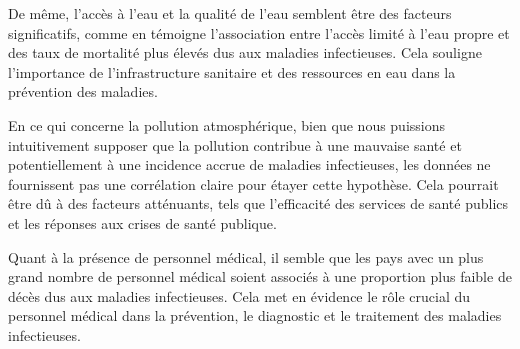 \documentclass[
]{article}
\begin{document}
De même, l'accès à l'eau et la qualité de l'eau semblent être des
facteurs significatifs, comme en témoigne l'association entre l'accès
limité à l'eau propre et des taux de mortalité plus élevés dus aux
maladies infectieuses. Cela souligne l'importance de l'infrastructure
sanitaire et des ressources en eau dans la prévention des maladies.

En ce qui concerne la pollution atmosphérique, bien que nous puissions
intuitivement supposer que la pollution contribue à une mauvaise santé
et potentiellement à une incidence accrue de maladies infectieuses, les
données ne fournissent pas une corrélation claire pour étayer cette
hypothèse. Cela pourrait être dû à des facteurs atténuants, tels que
l'efficacité des services de santé publics et les réponses aux crises de
santé publique.

Quant à la présence de personnel médical, il semble que les pays avec un
plus grand nombre de personnel médical soient associés à une proportion
plus faible de décès dus aux maladies infectieuses. Cela met en évidence
le rôle crucial du personnel médical dans la prévention, le diagnostic
et le traitement des maladies infectieuses.
\end{document}
